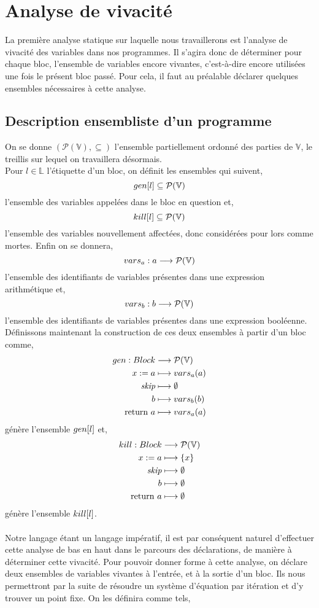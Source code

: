 \documentclass[a4paper, 10pt]{article}
\begin{document}
\section{Analyse de vivacité}
La première analyse statique sur laquelle nous travaillerons est l'analyse de vivacité des variables dans nos programmes. 
Il s'agira donc de déterminer pour chaque bloc, l'ensemble de variables encore vivantes, c'est-à-dire
encore utilisées une fois le présent bloc passé. Pour cela, il faut au préalable déclarer quelques ensembles 
nécessaires à cette analyse.

\subsection{Description ensembliste d'un programme}
On se donne $(\mathcal{P}(\mathbb{V}), \subseteq)$ l'ensemble partiellement ordonné des parties de $\mathbb{V}$, 
le treillis sur lequel on travaillera désormais.
\\
Pour $l \in \mathbb{L}$ l'étiquette d'un bloc, on définit les ensembles qui suivent,
\[gen[l] \subseteq \mathcal{P}(\mathbb{V})\]
l'ensemble des variables appelées dans le bloc en question et,
\[kill[l] \subseteq \mathcal{P}(\mathbb{V})\]
l'ensemble des variables nouvellement affectées, donc considérées pour lors comme mortes. Enfin on se donnera,
\[vars_a : a \longrightarrow \mathcal{P}(\mathbb{V})\]
l'ensemble des identifiants de variables présentes dans une expression arithmétique et,
\[vars_b : b \longrightarrow \mathcal{P}(\mathbb{V})\]
l'ensemble des identifiants de variables présentes dans une expression booléenne.
\\
Définissons maintenant la construction de ces deux ensembles à partir d'un bloc comme,
\begin{align*}
	gen : Block &\longrightarrow \mathcal{P}(\mathbb{V})\\
	{x}\space:=\space{a} &\longmapsto vars_a(a)\\
	\textit{skip} &\longmapsto \emptyset\\
	b &\longmapsto vars_b(b)\\
	\text{return }{a} &\longmapsto vars_a(a)
\end{align*}
génère l'ensemble $gen[l]$ et,
\begin{align*}
	kill : Block &\longrightarrow \mathcal{P}(\mathbb{V})\\
	{x}\space:=\space{a} &\longmapsto \{x\}\\
	\textit{skip} &\longmapsto \emptyset\\
	b &\longmapsto \emptyset\\
	\text{return }{a} &\longmapsto \emptyset
\end{align*}
génère l'ensemble $kill[l]$.
\\
\\
Notre langage étant un langage impératif, il est par conséquent naturel d'effectuer cette analyse de bas en haut dans le parcours des déclarations,
de manière à déterminer cette vivacité. Pour pouvoir donner forme à cette analyse, on déclare deux ensembles de variables vivantes à l'entrée, et à la
sortie d'un bloc. Ils nous permettront par la suite de résoudre un système d'équation par itération et d'y trouver un point fixe. 
On les définira comme tels,
\end{document}
